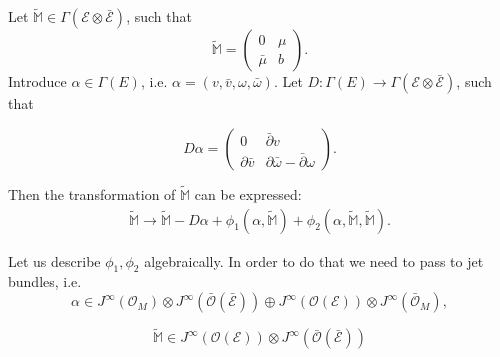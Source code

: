 \documentclass[9pt]{beamer}
\newcommand{\p}{\partial}
\def\cE{\mathcal{E}}
\def\bcE{\bar{\mathcal{E}}}
\begin{document}
\begin{frame}[t]


Let $\tilde{\mathbb{M}}\in \Gamma(\mathcal{E}\otimes\bar{\mathcal{E}})$, such that
\begin{equation*}
\tilde{\mathbb{M}}=\begin{pmatrix} 0 & \mu \\ 
\bar{\mu} & b \end{pmatrix}.
\end{equation*}
Introduce $\alpha\in \Gamma(E)$, i.e. $\alpha=(v, \bar v, \omega, \bar \omega)$. 
Let $D:\Gamma(E)\to \Gamma(\cE\otimes\bcE)$, such that

\[ D\alpha=\left( \begin{array}{cc}
0 & {\bar \p }v\\
{\p \bar v} & \p{\bar\omega}-{\bar\p} \omega \end{array} \right).\]

Then the transformation of $\tilde{\mathbb{M}}$  can be expressed:
\begin{eqnarray*}\label{algsym}
\tilde{\mathbb{M}}\to \tilde{\mathbb{M}}-D\alpha+ \phi_1(\alpha,\tilde{\mathbb{M}})+\phi_2(\alpha, \tilde{\mathbb{M}},\tilde{\mathbb{M}}).
\end{eqnarray*}

Let us describe $\phi_1, \phi_2$ algebraically. In order to do that we need to pass to jet bundles, i.e. 
$$\alpha\in J^{\infty}(\mathcal{O}_M)\otimes 
J^{\infty}({\bar{\mathcal{O}}}(\bcE))
\oplus J^{\infty}({\mathcal{O}}(\cE))
\otimes J^{\infty}({\bar{\mathcal{O}}}_M),$$
 
$$\tilde{\mathbb{M}}\in J^{\infty}({\mathcal{O}}(\cE))\otimes J^{\infty}({\bar{\mathcal{O}}}(\bcE))$$

\end{frame}


\end{document}

